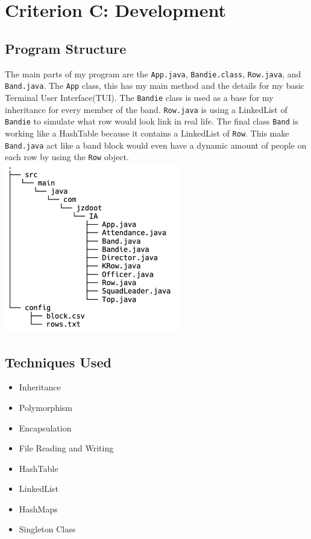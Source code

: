 \documentclass{article}
\begin{document}
\section{Criterion C: Development}
\subsection{Program Structure}
The main parts of my program are the \verb|App.java|, \verb|Bandie.class|, \verb|Row.java|, and \verb|Band.java|. The \verb|App| class, this has my main method and the details for my basic Terminal User Interface(TUI). The \verb|Bandie| class is used as a base for my inheritance for every member of the band. \verb|Row.java| is using a LinkedList of \verb|Bandie| to simulate what row would look link in real life. The final class \verb|Band| is working like a HashTable because it contains a LinkedList of \verb|Row|. This make \verb|Band.java| act like a band block would even have a dynamic amount of people on each row by using the \verb|Row| object.\\
\includegraphics[width=3in]{fileStructure.png}
\subsection{Techniques Used}
\begin{itemize}
	\item Inheritance
	\item Polymorphism
	\item Encapsulation
	\item File Reading and Writing
	\item HashTable
	\item LinkedList
	\item HashMaps
	\item Singleton Class
\end{itemize}
\end{document}
